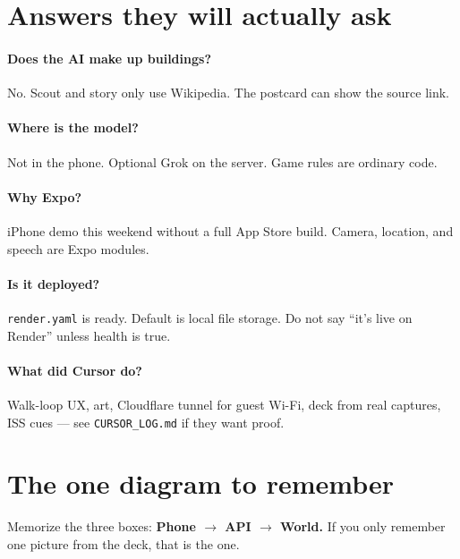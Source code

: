 \documentclass[11pt]{article}
\begin{document}
\section{Answers they will actually ask}

\paragraph{Does the AI make up buildings?}
No. Scout and story only use Wikipedia. The postcard can show the source link.

\paragraph{Where is the model?}
Not in the phone. Optional Grok on the server. Game rules are ordinary code.

\paragraph{Why Expo?}
iPhone demo this weekend without a full App Store build. Camera, location, and
speech are Expo modules.

\paragraph{Is it deployed?}
\texttt{render.yaml} is ready. Default is local file storage. Do not say ``it's live
on Render'' unless health is true.

\paragraph{What did Cursor do?}
Walk-loop UX, art, Cloudflare tunnel for guest Wi-Fi, deck from real captures, ISS
cues --- see \texttt{CURSOR\_LOG.md} if they want proof.

\section{The one diagram to remember}
Memorize the three boxes: \textbf{Phone $\rightarrow$ API $\rightarrow$ World.}
If you only remember one picture from the deck, that is the one.
\end{document}
